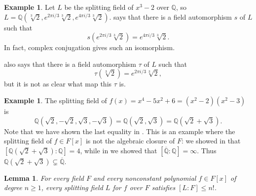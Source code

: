 \documentclass[12pt]{report}
\newtheorem{lemma}[theorem]{Lemma}
\numberwithin{equation}{section}
\numberwithin{theorem}{chapter}
\theoremstyle{definition}
\newtheorem{example}[theorem]{Example}
\newtheorem*{basic properties}{Basic Properties}
\newtheorem*{Important Remark}{Important Remark}
\newcommand{\Q}{\mathbb{Q}}
\begin{document}
\begin{example} 
Let $L$ be the splitting field of $x^3 - 2$ over $\Q$, so $L = \Q(\sqrt[3]{2}, e^{2 \pi i/3}\sqrt[3]{2}, e^{4 \pi i/3}\sqrt[3]{2})$.
 says that there is a field automorphism $s$ of $L$ such that 
$$s(e^{2 \pi i/3}\sqrt[3]{2}) = e^{4 \pi i/3}\sqrt[3]{2}.$$
In fact, complex conjugation gives such an isomorphism.

 also says that there is a field automorphism $\tau$ of $L$ such that 
$$\tau(\sqrt[3]{2}) = e^{2 \pi i/3}\sqrt[3]{2},$$ 
but it is not as clear what map this $\tau$ is.
\end{example}




\begin{example}
The splitting field of $f(x) = x^4 - 5x^2 + 6 = (x^2 - 2)(x^2 - 3)$ is $$\Q(\sqrt{2}, -\sqrt{2}, \sqrt{3}, -\sqrt{3}) = \Q(\sqrt{2}, \sqrt{3}) = \Q(\sqrt{2} + \sqrt{3}).$$
Note that we have shown the last equality in . This is an example where the splitting field of $f \in F[x]$ is not the algebraic closure of $F$: we showed in  that $[\Q(\sqrt{2} + \sqrt{3}) : \Q] = 4$, while in  we showed that $[\overline{\Q} : \Q] = \infty$. Thus $\Q(\sqrt{2} + \sqrt{3}) \subsetneq \overline{\Q}$.
\end{example}


\begin{lemma}\label{degree splitting field n!}
For every field $F$ and every nonconstant polynomial $f \in F[x]$ of degree $n \geqslant 1$, every splitting field $L$ for $f$ over $F$ satisfies $[L:F]\leqslant n!$.
\end{lemma}
\end{document}
